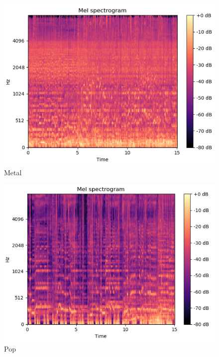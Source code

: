 \begin{figure}
\begin{center}
\includegraphics[scale=0.2]{./figures/metal.png}
\end{center}
\caption
{
Metal
}
\label{fig:big_picture2}
\end{figure}

\begin{figure}
\begin{center}
\includegraphics[scale=0.2]{./figures/pop.png}
\end{center}
\caption
{
Pop
}
\label{fig:big_picture3}
\end{figure}

